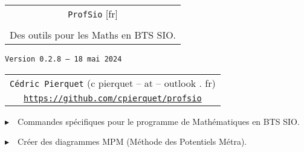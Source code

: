 \documentclass[french,a4paper,11pt]{article}
\def\TPversion{0.2.8}
\def\TPdate{18 mai 2024}
\begin{document}
\setlength{\aweboxleftmargin}{0.07\linewidth}
\setlength{\aweboxcontentwidth}{0.93\linewidth}
\setlength{\aweboxvskip}{8pt}

\pagestyle{fancy}

\thispagestyle{empty}

\vspace{2cm}

\begin{center}
	\begin{minipage}{0.75\linewidth}
	\begin{tcolorbox}[colframe=yellow,colback=yellow!15]
		\begin{center}
			\begin{tabular}{c}
				{\Huge \texttt{ProfSio} [fr]}\\
				\\
				{\LARGE Des outils pour les Maths en BTS SIO.} \\
			\end{tabular}
			
			\bigskip
			
			{\small \texttt{Version \TPversion{} -- \TPdate}}
		\end{center}
	\end{tcolorbox}
\end{minipage}
\end{center}

\begin{center}
	\begin{tabular}{c}
	\texttt{Cédric Pierquet} ({\ttfamily c pierquet -- at -- outlook . fr})\\
	\texttt{\url{https://github.com/cpierquet/profsio}}
\end{tabular}
\end{center}

\vspace{0.15cm}

{$\blacktriangleright$~~Commandes spécifiques pour le programme de Mathématiques en BTS SIO\footnotemark{}.}

\vspace{0.15cm}

{$\blacktriangleright$~~Créer des diagrammes MPM\footnotemark{} (Méthode des Potentiels Métra).}
\end{document}
